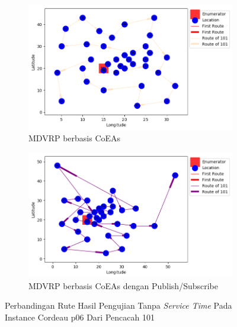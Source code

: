 \begin{figure}[H]
	\centering
	\begin{subfigure}[t]{\textwidth}
		\centering
		\includegraphics[width=\textwidth]{Resources/Images/cordeau_p06/cordeau_p06_notw_101_coes}
		\caption{MDVRP berbasis CoEAs}
		\label{fig:cordeau_p06_notw_101_coes}
	\end{subfigure}
	\begin{subfigure}[t]{\textwidth}
		\centering
		\includegraphics[width=\textwidth]{Resources/Images/cordeau_p06/cordeau_p06_notw_101_pubsub_coes}
		\caption{MDVRP berbasis CoEAs dengan Publish/Subscribe}
		\label{fig:cordeau_p06_notw_101_pubsub_coes}
	\end{subfigure}
	\caption{Perbandingan Rute Hasil Pengujian Tanpa \textit{Service Time} Pada Instance Cordeau p06 Dari Pencacah 101}
	\label{fig:cordeau_p06_notw_101}
\end{figure}


